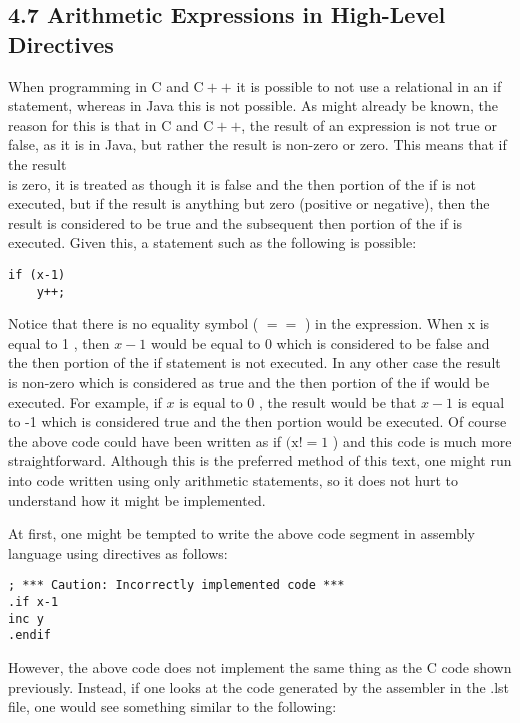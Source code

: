 \documentclass[10pt]{article}
\begin{document}
\subsection*{4.7 Arithmetic Expressions in High-Level Directives}
When programming in C and $\mathrm{C}++$ it is possible to not use a relational in an if statement, whereas in Java this is not possible. As might already be known, the reason for this is that in C and $\mathrm{C}++$, the result of an expression is not true or false, as it is in Java, but rather the result is non-zero or zero. This means that if the result\\
is zero, it is treated as though it is false and the then portion of the if is not executed, but if the result is anything but zero (positive or negative), then the result is considered to be true and the subsequent then portion of the if is executed. Given this, a statement such as the following is possible:

\begin{verbatim}
if (x-1)
    y++;
\end{verbatim}

Notice that there is no equality symbol ( $==$ ) in the expression. When x is equal to 1 , then $x-1$ would be equal to 0 which is considered to be false and the then portion of the if statement is not executed. In any other case the result is non-zero which is considered as true and the then portion of the if would be executed. For example, if $x$ is equal to 0 , the result would be that $x-1$ is equal to -1 which is considered true and the then portion would be executed. Of course the above code could have been written as if $(\mathrm{x}!=1$ ) and this code is much more straightforward. Although this is the preferred method of this text, one might run into code written using only arithmetic statements, so it does not hurt to understand how it might be implemented.

At first, one might be tempted to write the above code segment in assembly language using directives as follows:

\begin{verbatim}
; *** Caution: Incorrectly implemented code ***
.if x-1
inc y
.endif
\end{verbatim}

However, the above code does not implement the same thing as the C code shown previously. Instead, if one looks at the code generated by the assembler in the .lst file, one would see something similar to the following:
\end{document}
